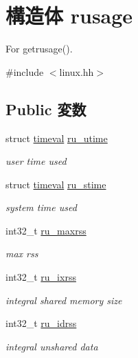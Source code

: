 \hypertarget{structArmLinux32_1_1rusage}{
\section{構造体 rusage}
\label{structArmLinux32_1_1rusage}
}


For getrusage().  


{\ttfamily \#include $<$linux.hh$>$}\subsection*{Public 変数}
\begin{DoxyCompactItemize}
\item 
struct \hyperlink{structArmLinux32_1_1timeval}{timeval} \hyperlink{structArmLinux32_1_1rusage_a40e27c5d4340b0c6532787d6740b22ab}{ru\_\-utime}
\begin{DoxyCompactList}\small\item\em user time used \item\end{DoxyCompactList}\item 
struct \hyperlink{structArmLinux32_1_1timeval}{timeval} \hyperlink{structArmLinux32_1_1rusage_a15f836efd7b69c0a0eb19f5d9505e3e9}{ru\_\-stime}
\begin{DoxyCompactList}\small\item\em system time used \item\end{DoxyCompactList}\item 
int32\_\-t \hyperlink{structArmLinux32_1_1rusage_a9ea3815a065c3417aada8e47f250d511}{ru\_\-maxrss}
\begin{DoxyCompactList}\small\item\em max rss \item\end{DoxyCompactList}\item 
int32\_\-t \hyperlink{structArmLinux32_1_1rusage_a0a293af174fb6b2a62209499ea0803ee}{ru\_\-ixrss}
\begin{DoxyCompactList}\small\item\em integral shared memory size \item\end{DoxyCompactList}\item 
int32\_\-t \hyperlink{structArmLinux32_1_1rusage_a9f8fc791df741d64411fa8aea728e7cf}{ru\_\-idrss}
\begin{DoxyCompactList}\small\item\em integral unshared data  \item\end{DoxyCompactList}\item 

\end{DoxyCompactItemize}
